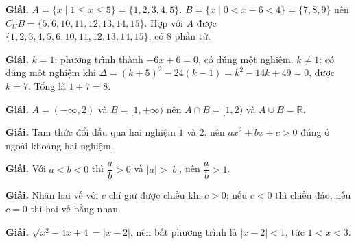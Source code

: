 \documentclass[11pt, a4paper]{article}
\begin{document}
\begin{dapan}[1 — Đáp án B]

\textbf{Giải.} $A=\{x \mid 1 \le x \le 5\}=\{1,2,3,4,5\}$. $B=\{x \mid 0<x-6<4\}=\{7,8,9\}$ nên $C_U B=\{5,6,10,11,12,13,14,15\}$. Hợp với $A$ được $\{1,2,3,4,5,6,10,11,12,13,14,15\}$, có 8 phần tử.


\end{dapan}
\vspace{0.3cm}
\begin{dapan}[2 — Đáp án B]

\textbf{Giải.} $k=1$: phương trình thành $-6x+6=0$, có đúng một nghiệm. $k \ne 1$: có đúng một nghiệm khi $\Delta=(k+5)^2-24(k-1)=k^2-14k+49=0$, được $k=7$. Tổng là $1+7=8$.


\end{dapan}
\vspace{0.3cm}
\begin{dapan}[3 — Đáp án A]

\textbf{Giải.} $A=(-\infty,2)$ và $B=[1,+\infty)$ nên $A \cap B=[1,2)$ và $A \cup B=\mathbb{R}$.


\end{dapan}
\vspace{0.3cm}
\begin{dapan}[4 — Đáp án D]

\textbf{Giải.} Tam thức đổi dấu qua hai nghiệm $1$ và $2$, nên $ax^2+bx+c>0$ đúng ở ngoài khoảng hai nghiệm.


\end{dapan}
\vspace{0.3cm}
\begin{dapan}[5 — Đáp án A]

\textbf{Giải.} Với $a<b<0$ thì $\dfrac{a}{b}>0$ và $\lvert a \rvert>\lvert b \rvert$, nên $\dfrac{a}{b}>1$.


\end{dapan}
\vspace{0.3cm}
\begin{dapan}[6 — Đáp án C]

\textbf{Giải.} Nhân hai vế với $c$ chỉ giữ được chiều khi $c>0$; nếu $c<0$ thì chiều đảo, nếu $c=0$ thì hai vế bằng nhau.


\end{dapan}
\vspace{0.3cm}
\begin{dapan}[7 — Đáp án C]

\textbf{Giải.} $\sqrt{x^2-4x+4}=\lvert x-2 \rvert$, nên bất phương trình là $\lvert x-2 \rvert<1$, tức $1<x<3$.


\end{dapan}
\end{document}
